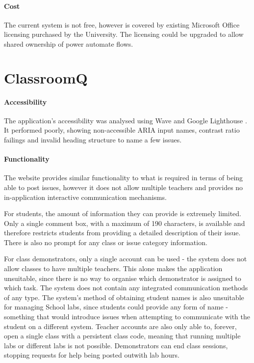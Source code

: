 \paragraph{Cost}  
The current system is not free, however is covered by existing Microsoft Office licensing purchased by the University. The licensing could be upgraded to allow shared ownership of power automate flows.

\newpage
\section{ClassroomQ}

\paragraph{Accessibility} The application's accessibility was analysed using Wave \cite{accesscheck} and Google Lighthouse \cite{Lighthouse}. It performed poorly, showing non-accessible ARIA input names, contrast ratio failings and invalid heading structure to name a few issues.

\paragraph{Functionality}
The website provides similar functionality to what is required in terms of being able to post issues, however it does not allow multiple teachers and provides no in-application interactive communication mechanisms.

For students, the amount of information they can provide is extremely limited. Only a single comment box, with a maximum of 190 characters, is available and therefore restricts students from providing a detailed description of their issue. There is also no prompt for any class or issue category information. 

For class demonstrators, only a single account can be used - the system does not allow classes to have multiple teachers. This alone makes the application unsuitable, since there is no way to organise which demonstrator is assigned to which task. The system does not contain any integrated communication methods of any type. The system's method of obtaining student names is also unsuitable for managing School labs, since students could provide any form of name - something that would introduce issues when attempting to communicate with the student on a different system. Teacher accounts are also only able to, forever, open a single class with a persistent class code, meaning that running multiple labs or different labs is not possible. Demonstrators can end class sessions, stopping requests for help being posted outwith lab hours.

